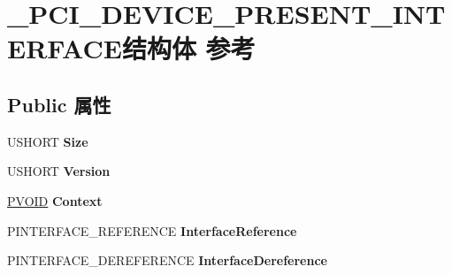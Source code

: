 \hypertarget{struct___p_c_i___d_e_v_i_c_e___p_r_e_s_e_n_t___i_n_t_e_r_f_a_c_e}{}\section{\+\_\+\+P\+C\+I\+\_\+\+D\+E\+V\+I\+C\+E\+\_\+\+P\+R\+E\+S\+E\+N\+T\+\_\+\+I\+N\+T\+E\+R\+F\+A\+C\+E结构体 参考}
\label{struct___p_c_i___d_e_v_i_c_e___p_r_e_s_e_n_t___i_n_t_e_r_f_a_c_e}
\subsection*{Public 属性}
\begin{DoxyCompactItemize}
\item 
\mbox{\label{struct___p_c_i___d_e_v_i_c_e___p_r_e_s_e_n_t___i_n_t_e_r_f_a_c_e_a803068873b5f4d186b125e4cd04671c6}} 
U\+S\+H\+O\+RT {\bfseries Size}
\item 
\mbox{\label{struct___p_c_i___d_e_v_i_c_e___p_r_e_s_e_n_t___i_n_t_e_r_f_a_c_e_ab72182c1a1c17e375aa9da567ccafaff}} 
U\+S\+H\+O\+RT {\bfseries Version}
\item 
\mbox{\label{struct___p_c_i___d_e_v_i_c_e___p_r_e_s_e_n_t___i_n_t_e_r_f_a_c_e_ac965f690d73ed2c5cdf65a5f5d928d7b}} 
\hyperlink{interfacevoid}{P\+V\+O\+ID} {\bfseries Context}
\item 
\mbox{\label{struct___p_c_i___d_e_v_i_c_e___p_r_e_s_e_n_t___i_n_t_e_r_f_a_c_e_a3b2b50026662a5de75584c960f6cbfce}} 
P\+I\+N\+T\+E\+R\+F\+A\+C\+E\+\_\+\+R\+E\+F\+E\+R\+E\+N\+CE {\bfseries Interface\+Reference}
\item 
\mbox{\label{struct___p_c_i___d_e_v_i_c_e___p_r_e_s_e_n_t___i_n_t_e_r_f_a_c_e_a4671d5c901bfd15ae2ebdf82b0e31f68}} 
P\+I\+N\+T\+E\+R\+F\+A\+C\+E\+\_\+\+D\+E\+R\+E\+F\+E\+R\+E\+N\+CE {\bfseries Interface\+Dereference}
\item 

\end{DoxyCompactItemize}
